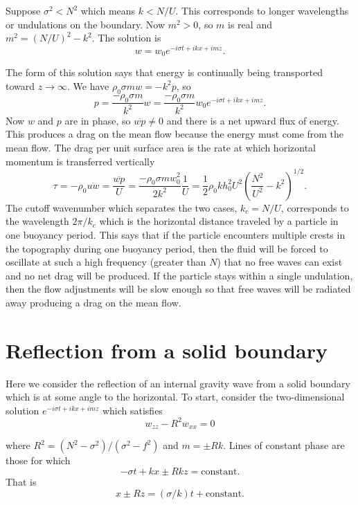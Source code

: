 Suppose $\sigma^2<N^2$ which means $k<N/U$. This corresponds to longer
wavelengths or undulations on the boundary. Now $m^2>0$, so $m$ is real and
$m^2=(N/U)^2-k^2$. The solution is
\[
	w=w_0e^{-i\sigma t+ikx+imz}.
\]

\sourcepagebreak

The form of this solution says that energy is continually being transported toward
$z\to\infty$. We have $\rho_0\sigma mw=-k^2p$, so
\[
	p=\frac{-\rho_0\sigma m}{k^2}w
	=\frac{-\rho_0\sigma m}{k^2}w_0e^{-i\sigma t+ikx+imz}.
\]
Now $w$ and $p$ are in phase, so $\overline{wp}\ne0$ and there is a net upward flux of energy. This
produces a drag on the mean flow because the energy must come from the mean flow.
The drag per unit surface area is the rate at which horizontal momentum is transferred
vertically
\[
	\tau=-\rho_0\overline{uw}
	=\frac{\overline{wp}}{U}
	=\frac{-\rho_0\sigma m w_0^2}{2k^2}\frac1U
	=\frac12\rho_0kh_0^2U^2
	\left(\frac{N^2}{U^2}-k^2\right)^{1/2}.
\]
The cutoff wavenumber which separates the two cases, $k_c=N/U$, corresponds
to the wavelength $2\pi/k_c$ which is the horizontal distance traveled by a particle in one
buoyancy period. This says that if the particle encounters multiple crests in the
topography during one buoyancy period, then the fluid will be forced to oscillate at
such a high frequency (greater than $N$) that no free waves can exist and no net drag
will be produced. If the particle stays within a single undulation, then the flow
adjustments will be slow enough so that free waves will be radiated away producing a
drag on the mean flow.

\section{Reflection from a solid boundary}

Here we consider the reflection of an internal gravity wave from a solid boundary which
is at some angle to the horizontal. To start, consider the two-dimensional solution
$e^{-i\sigma t+ikx+imz}$ which satisfies
\[
	w_{zz}-R^2w_{xx}=0
\]

\sourcepagebreak

where $R^2=(N^2-\sigma^2)/(\sigma^2-f^2)$ and $m=\pm Rk$. Lines of constant phase are those for
which
\[
	-\sigma t+kx\pm Rkz=\text{constant}.
\]
That is
\[
	x\pm Rz=(\sigma/k)t+\text{constant}.
\]

